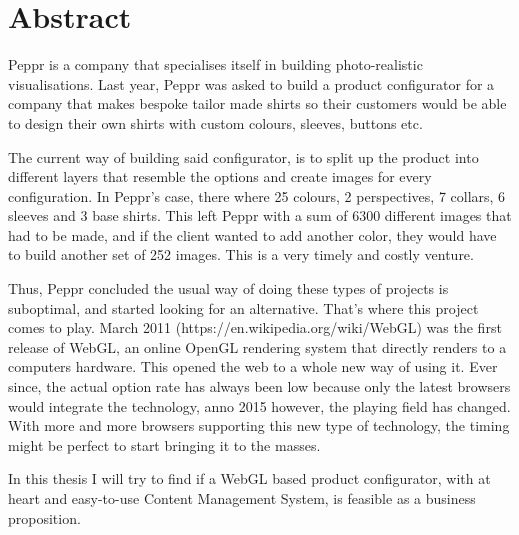 \newpage
\section{Abstract}

Peppr is a company that specialises itself in building photo-realistic visualisations. Last year, Peppr was asked to build a product configurator for a company that makes bespoke tailor made shirts so their customers would be able to design their own shirts with custom colours, sleeves, buttons etc. 

The current way of building said configurator, is to split up the product into different layers that resemble the options and create images for every configuration. In Peppr's case, there where 25 colours, 2 perspectives, 7 collars, 6 sleeves and 3 base shirts. This left Peppr with a sum of 6300 different images that had to be made, and if the client wanted to add another color, they would have to build another set of 252 images. This is a very timely and costly venture.

Thus, Peppr concluded the usual way of doing these types of projects is suboptimal, and started looking for an alternative. That's where this project comes to play. March 2011 (https://en.wikipedia.org/wiki/WebGL) was the first release of WebGL, an online OpenGL rendering system that directly renders to a computers hardware. This opened the web to a whole new way of using it. Ever since, the actual option rate has always been low because only the latest browsers would integrate the technology, anno 2015 however, the playing field has changed. With more and more browsers supporting this new type of technology, the timing might be perfect to start bringing it to the masses.

In this thesis I will try to find if a WebGL based product configurator, with at heart and easy-to-use Content Management System, is feasible as a business proposition.
\newpage